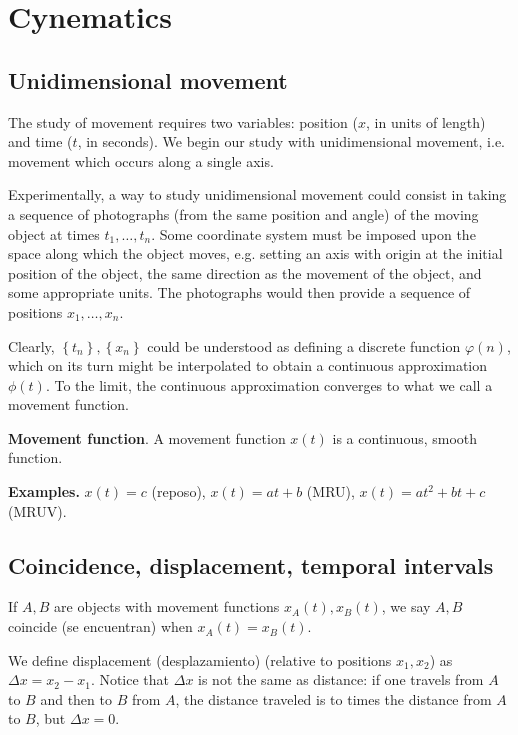 \documentclass[12pt]{article}
\theoremstyle{definition}
\begin{document}
\section{Cynematics}


\subsection{Unidimensional movement}

The study of movement requires two variables: position ($x$, in units of length)
and time ($t$, in seconds). We begin our study with unidimensional movement,
i.e. movement which occurs along a single axis. 

Experimentally, a way to study unidimensional movement could consist in taking a
sequence of photographs (from the same position and angle) of the moving object
at times $t_1, \ldots, t_n$. Some coordinate system must be imposed upon the
space along which the object moves, e.g. setting an axis with origin at the
initial position of the object, the same direction as the movement of the
object, and some appropriate units. The photographs would then provide a
sequence of positions $x_1, \ldots, x_n$.

Clearly, $\left\{ t_n \right\}, \left\{ x_n \right\}  $ could be understood as
defining a discrete function $\varphi(n)$, which on its turn might be
interpolated to obtain a continuous approximation $\phi(t)$. To the limit, the
continuous approximation converges to what we call a movement function. 

\begin{shaded}
    \textbf{Movement function}. A movement function $x(t)$ is a continuous,
    smooth function.

    \textbf{Examples.} $x(t) = c$ (reposo), $x(t) = at + b$ (MRU), $x(t) = at^2
    + bt  + c$ (MRUV).
\end{shaded}

\subsection{Coincidence, displacement, temporal intervals}

If $A, B$ are objects with movement functions $x_A(t), x_B(t)$, we say $A, B$
coincide (se encuentran) when $x_A(t) = x_B(t)$.

We define displacement (desplazamiento) (relative to positions $x_1, x_2$) as
$\Delta x = x_2 - x_1$. Notice that $\Delta x$ is not the same as distance: if
one travels from $A$ to $B$ and then to $B$ from $A$, the distance traveled is
to times the distance from $A$ to $B$, but $\Delta x = 0$.
\end{document}
